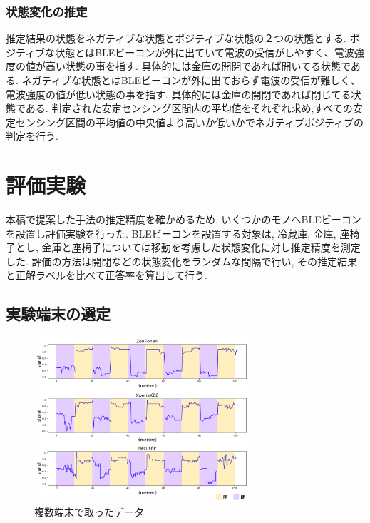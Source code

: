 \documentclass[Japanese]{dicomopapers}
\begin{document}
\subsubsection{状態変化の推定}
推定結果の状態をネガティブな状態とポジティブな状態の２つの状態とする.
ポジティブな状態とはBLEビーコンが外に出ていて電波の受信がしやすく、電波強度の値が高い状態の事を指す. 具体的には金庫の開閉であれば開いてる状態である.
ネガティブな状態とはBLEビーコンが外に出ておらず電波の受信が難しく、電波強度の値が低い状態の事を指す. 具体的には金庫の開閉であれば閉じてる状態である.
判定された安定センシング区間内の平均値をそれぞれ求め,すべての安定センシング区間の平均値の中央値より高いか低いかでネガティブポジティブの判定を行う.





\section{評価実験}

本稿で提案した手法の推定精度を確かめるため, いくつかのモノへBLEビーコンを設置し評価実験を行った.
BLEビーコンを設置する対象は, 冷蔵庫, 金庫, 座椅子とし, 金庫と座椅子については移動を考慮した状態変化に対し推定精度を測定した.
評価の方法は開閉などの状態変化をランダムな間隔で行い, その推定結果と正解ラベルを比べて正答率を算出して行う.

\subsection{実験端末の選定}

\begin{figure}[ht]
    \centering
    \includegraphics[width=8cm]{mix.png}
    \caption{複数端末で取ったデータ}
    \label{multi-data}
\end{figure}
\end{document}
